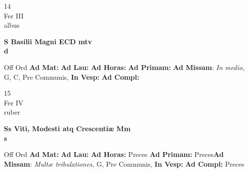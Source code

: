 \documentclass[10pt, openany]{book}
\begin{document}
    \begin{center}
        \begin{minipage}{3.5in}
            \vspace{2em}
            \begin{minipage}{0.5in}
                {\Huge 14} \\
                {\normalsize Fer III} \\
                {\normalsize albus}
            \end{minipage}
            \begin{minipage}{3.0in}
                \textbf{ \large S Basilii Magni ECD mtv \\
                \textnormal{\normalsize d}} \\ 
            \end{minipage}
            \begin{justify}Off Ord
                \textbf{Ad Mat: }
                \textbf{Ad Lau: }
                \textbf{Ad Horas: }
                \textbf{Ad Primam: }\textbf{Ad Missam}: \textit{In medio,} G, C, Pre Communis,  
                \textbf{In Vesp: }
                \textbf{Ad Compl: }
            \end{justify}
        \end{minipage}
    \end{center}

    \begin{center}
        \begin{minipage}{3.5in}
            \vspace{2em}
            \begin{minipage}{0.5in}
                {\Huge 15} \\
                {\normalsize Fer IV} \\
                {\normalsize ruber}
            \end{minipage}
            \begin{minipage}{3.0in}
                \textbf{ \large Ss Viti, Modesti atq Crescentiæ Mm \\
                \textnormal{\normalsize s}} \\ 
            \end{minipage}
            \begin{justify}Off Ord
                \textbf{Ad Mat: }
                \textbf{Ad Lau: }
                \textbf{Ad Horas: }Preces
                \textbf{Ad Primam: }Preces\textbf{Ad Missam}: \textit{Multæ tribulationes,} G, Pre Communis,  
                \textbf{In Vesp: }
                \textbf{Ad Compl: }Preces
            \end{justify}
        \end{minipage}
    \end{center}
\end{document}
